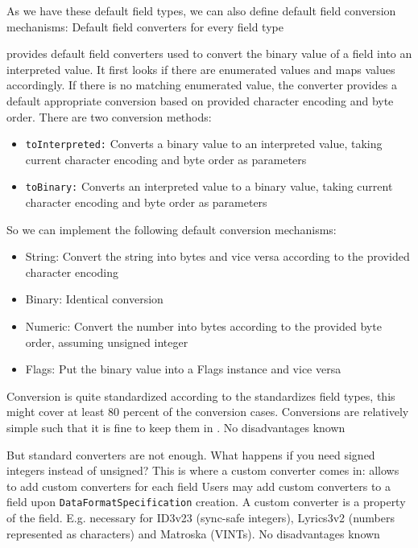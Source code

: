 As we have these default field types, we can also define default field conversion mechanisms:
{%
Default field converters for every field type
}
{%
\COMPdataFormatManagement{} provides default field converters used to convert the binary value of a field into an interpreted value. It first looks if there are enumerated values and maps values accordingly. If there is no matching enumerated value, the converter provides a default appropriate conversion based on provided character encoding and byte order. There are two conversion methods:
\begin{itemize}
\item \texttt{toInterpreted:} Converts a binary value to an interpreted value, taking current character encoding and byte order as parameters
\item \texttt{toBinary:} Converts an interpreted value to a binary value, taking current character encoding and byte order as parameters
\end{itemize}

So we can implement the following default conversion mechanisms:
\begin{itemize}
\item String: Convert the string into bytes and vice versa according to the provided character encoding
\item Binary: Identical conversion
\item Numeric: Convert the number into bytes according to the provided byte order, assuming unsigned integer
\item Flags: Put the binary value into a Flags instance and vice versa
\end{itemize}
}
{%
Conversion is quite standardized according to the standardizes field types, this might cover at least 80 percent of the conversion cases. Conversions are relatively simple such that it is fine to keep them in \COMPdataFormatManagement{}.
}
{%
No disadvantages known
}

But standard converters are not enough. What happens if you need signed integers instead of unsigned? This is where a custom converter comes in:
{%
\COMPdataFormatManagement{} allows to add custom converters for each field
}
{%
Users may add custom converters to a field upon \texttt{DataFormatSpecification} creation. A custom converter is a property of the field.
}
{%
E.g. necessary for ID3v23 (sync-safe integers), Lyrics3v2 (numbers represented as characters) and Matroska (VINTs).
}
{%
No disadvantages known
}

